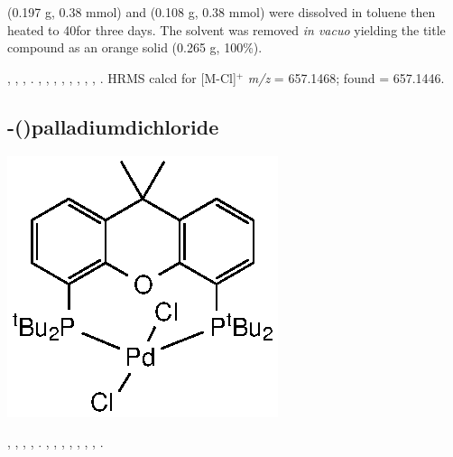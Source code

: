 \tBuThixantphos{} (0.197 g, 0.38 mmol) and \ce{[Pd(COD)Cl2]} (0.108 g, 0.38 mmol) were dissolved in toluene then heated to 40\degC for three days.  The solvent was removed \emph{in vacuo} yielding the title compound as an orange solid (0.265 g, 100\%).


,
,
,
.
,
,
,
,
,
,
,
,
.
HRMS calcd for  [M-Cl]$^+$ \emph{m/z} = 657.1468; found = 657.1446.


\subsection*{\trans-(\tBuXantphos)palladiumdichloride}
\begin{structure}[h]
\begin{center}
\includegraphics{../Structures/CtBuPdCl2.eps}
\end{center}
\end{structure}


,
,
,
,
.
,
,
,
,
,
,
,
.

